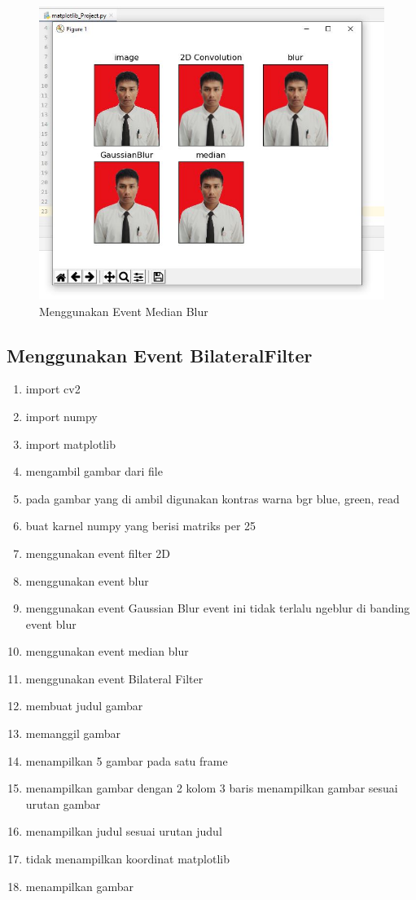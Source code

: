 \begin{figure}[ht]
\centering
\includegraphics[scale=0.6]{figures/2,62.jpg}
\caption{Menggunakan Event Median Blur}
\label{contoh}
\end{figure}







\newpage
\subsection{Menggunakan Event BilateralFilter}

\begin{enumerate}
	\item import cv2
	\item import numpy
	\item import matplotlib
	\item mengambil gambar dari file
	\item pada gambar yang di ambil digunakan kontras warna bgr blue, green, read
	\item buat karnel numpy yang berisi matriks per 25
	\item menggunakan event filter 2D
	\item menggunakan event blur
	\item menggunakan event Gaussian Blur event ini tidak terlalu ngeblur di banding event blur
	\item menggunakan event median blur
	\item menggunakan event Bilateral Filter
	\item membuat judul gambar
	\item memanggil gambar
	\item menampilkan 5 gambar pada satu frame
	\item menampilkan gambar dengan 2 kolom 3 baris menampilkan gambar sesuai urutan gambar
	\item menampilkan judul sesuai urutan judul
	\item tidak menampilkan koordinat matplotlib
	\item menampilkan gambar
\end{enumerate}

